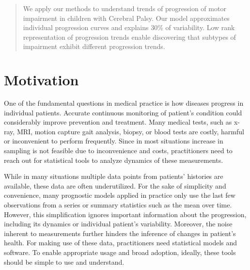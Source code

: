 \documentclass[preprint]{imsart}
\numberwithin{equation}{section}
\theoremstyle{plain}
\begin{document}
\begin{frontmatter}
\begin{abstract}
  We apply our methods to understand trends of progression of motor impairment in children with Cerebral Palsy. Our model approximates individual progression curves and explains 30\% of variability. Low rank representation of progression trends enable discovering that subtypes of impairment exhibit different progression trends. 
  
\end{abstract}

\begin{keyword}[class=MSC]
\end{keyword}

\begin{keyword}
\end{keyword}

\end{frontmatter}

\maketitle


\section{Motivation}

One of the fundamental questions in medical practice is how diseases progress in individual patients. Accurate continuous monitoring of patient's condition could considerably improve prevention and treatment. Many medical tests, such as x-ray, MRI, motion capture gait analysis, biopsy, or blood tests are costly, harmful or inconvenient to perform frequently. Since in most situations increase in sampling is not feasible due to inconvenience and costs, practitioners need to reach out for statistical tools to analyze dynamics of these measurements.

While in many situations multiple data points from patients' histories are available, these data are often underutilized. For the sake of simplicity and convenience, many prognostic models applied in practice only use the last few observations from a series or summary statistics such as the mean over time. However, this simplification ignores important information about the progression, including its dynamics or individual patient's variability. Moreover, the noise inherent to measurements further hinders the inference of changes in patient's health. For making use of these data, practitioners need statistical models and software. To enable appropriate usage and broad adoption, ideally, these tools should be simple to use and understand.
\end{document}
